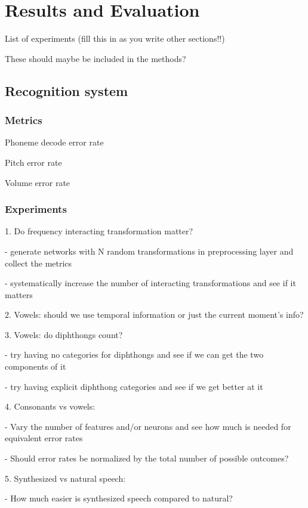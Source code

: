 \chapter{Results and Evaluation}



List of experiments (fill this in as you write other sections!!)

These should maybe be included in the methods?

\section{Recognition system}

\subsection{Metrics}

Phoneme decode error rate

Pitch error rate

Volume error rate

\subsection{Experiments}

1. Do frequency interacting transformation matter?

- generate networks with N random transformations
  in preprocessing layer and collect the metrics

- systematically increase the number of interacting
  transformations and see if it matters

2. Vowels: should we use temporal information or just
   the current moment's info?

3. Vowels: do diphthongs count?

- try having no categories for diphthongs and see if
  we can get the two components of it

- try having explicit diphthong categories and see
  if we get better at it

4. Consonants vs vowels:

- Vary the number of features and/or neurons and see
  how much is needed for equivalent error rates

  - Should error rates be normalized by the total number
    of possible outcomes?

5. Synthesized vs natural speech:

- How much easier is synthesized speech compared to natural?
